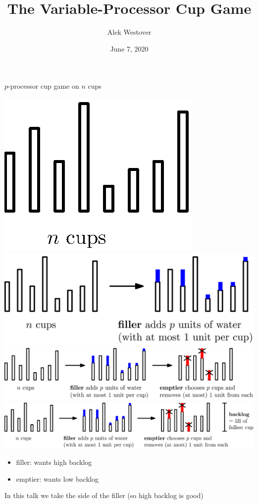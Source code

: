 \documentclass[xcolor=x11names, svgnames, rgb]{beamer}
\title{The Variable-Processor Cup Game}
\author{Alek Westover}
\institute{Belmont High School}
\date{June 7, 2020}
\begin{document}
 
\frame{\titlepage}

\begin{frame}[c]{$p$-processor cup game on $n$ cups}
  \begin{overprint}
     \includegraphics[width=\linewidth]{initDef/initDef0.eps}
     \includegraphics[width=\linewidth]{initDef/initDef1.eps}
     \includegraphics[width=\linewidth]{initDef/initDef2.eps}
     \includegraphics[width=\linewidth]{initDef/initDef3.eps}
  \end{overprint}
  \begin{overprint}
     {
      \begin{itemize}
        \item filler: wants high backlog 
        \item emptier: wants low backlog
      \end{itemize}
      In this talk we take the side of the filler (so high backlog is good) 
    }
  \end{overprint}
\end{frame}
\end{document}
